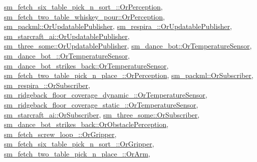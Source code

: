 \hyperlink{classsm__fetch__six__table__pick__n__sort__1_1_1OrPerception_acc62f973325e2ac14dd9df28fa20a685}{sm\+\_\+fetch\+\_\+six\+\_\+table\+\_\+pick\+\_\+n\+\_\+sort\+\_\+::\+Or\+Perception}, \hyperlink{classsm__fetch__two__table__whiskey__pour_1_1OrPerception_a0b3a159df93b90888fdac1d56032fcc7}{sm\+\_\+fetch\+\_\+two\+\_\+table\+\_\+whiskey\+\_\+pour\+::\+Or\+Perception}, \hyperlink{classsm__packml_1_1OrUpdatablePublisher_a1689f8aac565881e3f65246b6d6ce6a2}{sm\+\_\+packml\+::\+Or\+Updatable\+Publisher}, \hyperlink{classsm__respira__1_1_1OrUpdatablePublisher_a0ae110d830e583571fc79b4daa9d424d}{sm\+\_\+respira\+\_\+::\+Or\+Updatable\+Publisher}, \hyperlink{classsm__starcraft__ai_1_1OrUpdatablePublisher_a349747bdf330b39d76871cd49d36d0eb}{sm\+\_\+starcraft\+\_\+ai\+::\+Or\+Updatable\+Publisher}, \hyperlink{classsm__three__some_1_1OrUpdatablePublisher_aecda3521d565c139c75080f12e7045e0}{sm\+\_\+three\+\_\+some\+::\+Or\+Updatable\+Publisher}, \hyperlink{classsm__dance__bot_1_1OrTemperatureSensor_a2e944e459a695774dcf7fdbd5ac93b01}{sm\+\_\+dance\+\_\+bot\+::\+Or\+Temperature\+Sensor}, \hyperlink{classsm__dance__bot__2_1_1OrTemperatureSensor_a8ffbdea008961e707101f496c6b91f50}{sm\+\_\+dance\+\_\+bot\+\_\+::\+Or\+Temperature\+Sensor}, \hyperlink{classsm__dance__bot__strikes__back_1_1OrTemperatureSensor_a5ad96122dd84bf27e0a1f5c7c87be7e2}{sm\+\_\+dance\+\_\+bot\+\_\+strikes\+\_\+back\+::\+Or\+Temperature\+Sensor}, \hyperlink{classsm__fetch__two__table__pick__n__place__1_1_1OrPerception_a9205e355033bafe9b4be2d937cb46783}{sm\+\_\+fetch\+\_\+two\+\_\+table\+\_\+pick\+\_\+n\+\_\+place\+\_\+::\+Or\+Perception}, \hyperlink{classsm__packml_1_1OrSubscriber_a21c2958e73930f7260832656f664a769}{sm\+\_\+packml\+::\+Or\+Subscriber}, \hyperlink{classsm__respira__1_1_1OrSubscriber_a085137f52045333e18eea320e52dc1f1}{sm\+\_\+respira\+\_\+::\+Or\+Subscriber}, \hyperlink{classsm__ridgeback__floor__coverage__dynamic__1_1_1OrTemperatureSensor_a492e0aa0c05b86c10458997a8367a42b}{sm\+\_\+ridgeback\+\_\+floor\+\_\+coverage\+\_\+dynamic\+\_\+::\+Or\+Temperature\+Sensor}, \hyperlink{classsm__ridgeback__floor__coverage__static__1_1_1OrTemperatureSensor_ac2686798e3b57c71ac876295027bf78d}{sm\+\_\+ridgeback\+\_\+floor\+\_\+coverage\+\_\+static\+\_\+::\+Or\+Temperature\+Sensor}, \hyperlink{classsm__starcraft__ai_1_1OrSubscriber_a6c50b70cd03e31c6c87a80eca9510c05}{sm\+\_\+starcraft\+\_\+ai\+::\+Or\+Subscriber}, \hyperlink{classsm__three__some_1_1OrSubscriber_af1362388fc43c43a38d75542931e348a}{sm\+\_\+three\+\_\+some\+::\+Or\+Subscriber}, \hyperlink{classsm__dance__bot__strikes__back_1_1OrObstaclePerception_a11bcaa362ceecfbd5b26562e4b380c3c}{sm\+\_\+dance\+\_\+bot\+\_\+strikes\+\_\+back\+::\+Or\+Obstacle\+Perception}, \hyperlink{classsm__fetch__screw__loop__1_1_1OrGripper_a754b53cdd8aea41c17938208d8eb8e69}{sm\+\_\+fetch\+\_\+screw\+\_\+loop\+\_\+::\+Or\+Gripper}, \hyperlink{classsm__fetch__six__table__pick__n__sort__1_1_1OrGripper_ae7a6a22fddaafc2fe376da2362be8001}{sm\+\_\+fetch\+\_\+six\+\_\+table\+\_\+pick\+\_\+n\+\_\+sort\+\_\+::\+Or\+Gripper}, \hyperlink{classsm__fetch__two__table__pick__n__place__1_1_1OrArm_a72e35b5145902c49a81ccb50785a567e}{sm\+\_\+fetch\+\_\+two\+\_\+table\+\_\+pick\+\_\+n\+\_\+place\+\_\+::\+Or\+Arm}, 